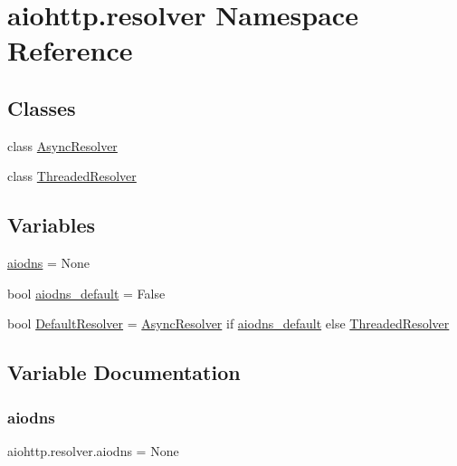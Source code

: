 \hypertarget{namespaceaiohttp_1_1resolver}{}\section{aiohttp.\+resolver Namespace Reference}
\label{namespaceaiohttp_1_1resolver}
\subsection*{Classes}
\begin{DoxyCompactItemize}
\item 
class \hyperlink{classaiohttp_1_1resolver_1_1_async_resolver}{Async\+Resolver}
\item 
class \hyperlink{classaiohttp_1_1resolver_1_1_threaded_resolver}{Threaded\+Resolver}
\end{DoxyCompactItemize}
\subsection*{Variables}
\begin{DoxyCompactItemize}
\item 
\hyperlink{namespaceaiohttp_1_1resolver_a36252581da3bc176fb7532af03701b81}{aiodns} = None
\item 
bool \hyperlink{namespaceaiohttp_1_1resolver_a50e4d935ee52f8447014475a8ac42a73}{aiodns\+\_\+default} = False
\item 
bool \hyperlink{namespaceaiohttp_1_1resolver_adc1f445daf8808f6a82e0d34ad2f1e75}{Default\+Resolver} = \hyperlink{classaiohttp_1_1resolver_1_1_async_resolver}{Async\+Resolver} if \hyperlink{namespaceaiohttp_1_1resolver_a50e4d935ee52f8447014475a8ac42a73}{aiodns\+\_\+default} else \hyperlink{classaiohttp_1_1resolver_1_1_threaded_resolver}{Threaded\+Resolver}
\end{DoxyCompactItemize}


\subsection{Variable Documentation}
\mbox{\label{namespaceaiohttp_1_1resolver_a36252581da3bc176fb7532af03701b81}} 
\subsubsection{\texorpdfstring{aiodns}{aiodns}}
{\footnotesize\ttfamily aiohttp.\+resolver.\+aiodns = None}

